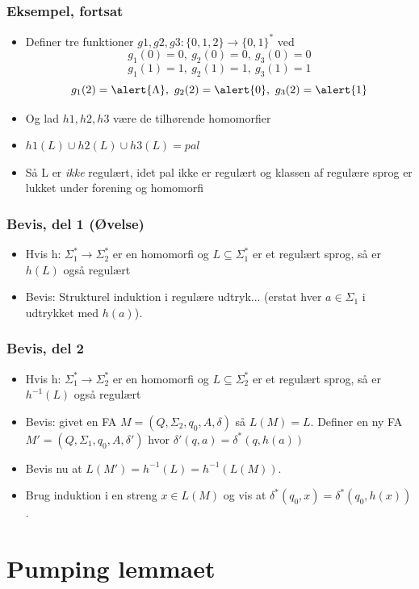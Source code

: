 \documentclass{beamer}
\begin{document}
\begin{frame}
\frametitle{Eksempel, fortsat}
\begin{itemize}[<+->]
\item  Definer tre funktioner  $g1,g2,g3:  \{0,1,2\}\rightarrow\{0,1\}^*$  ved 
\[g_1(0)=0,\ g_2(0)=0,\ g_3(0)=0 \]
\[g_1(1)=1,\ g_2(1)=1,\ g_3(1)=1 \]
\[g_1(2)=\alert{\Lambda},\ g_2(2)=\alert{0},\ g_3(2)=\alert{1} \]
\item  Og lad $h1,h2,h3$ være de tilhørende homomorfier 
\item  $h1(L) \cup h2(L) \cup h3(L) = pal$ 
\item  Så L er \emph{ikke} regulært, idet pal ikke er regulært og klassen  
af regulære sprog er lukket under forening og homomorfi
\end{itemize}
\end{frame}

\begin{frame}
\frametitle{Bevis, del 1 (Øvelse)}
\begin{itemize}[<+->]
\item Hvis h: $\Sigma_1^*\rightarrow\Sigma_2^*$ er en homomorfi og
  $L\subseteq\Sigma_1^*$ er et regulært sprog, så er $h(L)$ også regulært
  \item Bevis: Strukturel induktion i regulære udtryk...
    (erstat hver $a\in\Sigma_1$ i udtrykket med $h(a)$).
\end{itemize}
\end{frame}

\begin{frame}
\frametitle{Bevis, del 2}
\begin{itemize}[<+->]
\item Hvis h: $\Sigma_1^*\rightarrow\Sigma_2^*$ er en homomorfi og
  $L\subseteq\Sigma_2^*$ er et regulært sprog, så er $h^{-1}(L)$ også regulært
  \item Bevis: givet en FA $M=(Q, \Sigma_2, q_0, A, \delta)$ så $L(M)=L$.
    Definer en ny FA $M' = (Q, \Sigma_1, q_0, A, \delta ')$ hvor
    $\delta '(q,a) = \delta^*(q,h(a))$
  \item Bevis nu at $L(M')=h^{-1}(L)=h^{-1}(L(M))$.
  \item Brug induktion i en
    streng $x\in L(M)$ og vis at $\delta^*(q_0,x) =
    \delta^*(q_0,h(x))$.
\end{itemize}
\end{frame}

\section{Pumping lemmaet}
\end{document}
